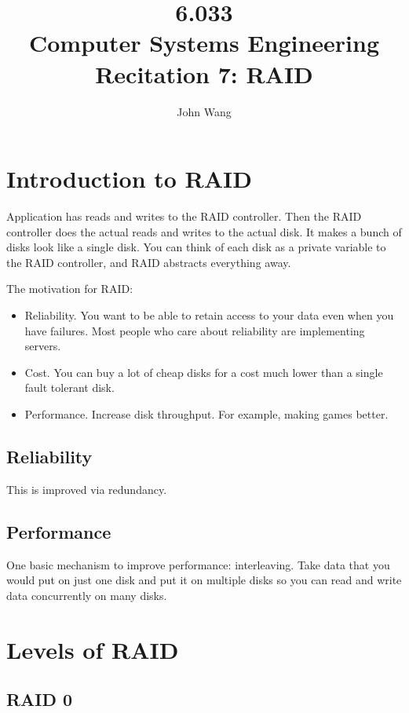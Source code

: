 \documentclass[psamsfonts]{amsart}
\title{6.033 \\
Computer Systems Engineering \\
Recitation 7: RAID}
\author{John Wang}
\begin{document}
\maketitle

\section{Introduction to RAID}

Application has reads and writes to the RAID controller. Then the RAID controller does the actual reads and writes to the actual disk. It makes a bunch of disks look like a single disk. You can think of each disk as a private variable to the RAID controller, and RAID abstracts everything away.

The motivation for RAID:
\begin{itemize}
  \item Reliability. You want to be able to retain access to your data even when you have failures. Most people who care about reliability are implementing servers.
  \item Cost. You can buy a lot of cheap disks for a cost much lower than a single fault tolerant disk.
  \item Performance. Increase disk throughput. For example, making games better.
\end{itemize}

\subsection{Reliability}

This is improved via redundancy. 

\subsection{Performance}

One basic mechanism to improve performance: interleaving. Take data that you would put on just one disk and put it on multiple disks so you can read and write data concurrently on many disks.

\section{Levels of RAID}

\subsection{RAID 0}
\end{document}
